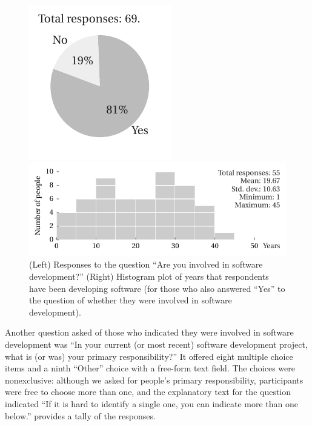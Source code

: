 \documentclass{casicswhitepaper}
\begin{document}
\begin{figure}[thb]
  \vspace*{2.5ex}
  \hspace*{0.1in}
  \begin{minipage}[b]{0.265\linewidth}
    \includegraphics{files/plots/number-of-developers.pdf}
  \end{minipage}%
  \begin{minipage}[b]{0.75\linewidth}
    \includegraphics{files/plots/histogram-years.pdf}
  \end{minipage}%
  \vspace*{-1ex}
  \caption{(Left) Responses to the question  ``Are you involved in software development?'' (Right) Histogram plot of years that respondents have been developing software (for those who also answered ``Yes'' to the question of whether they were involved in software development).}
  \label{years}
\end{figure}

Another question asked of those who indicated they were involved in software development was ``In your current (or most recent) software development project, what is (or was) your primary responsibility?'' It offered eight multiple choice items and a ninth ``Other'' choice with a free-form text field.  The choices were nonexclusive: although we asked for people's primary responsibility, participants were free to choose more than one, and the explanatory text for the question indicated ``If it is hard to identify a single one, you can indicate more than one below.''   provides a tally of the responses.
\end{document}
